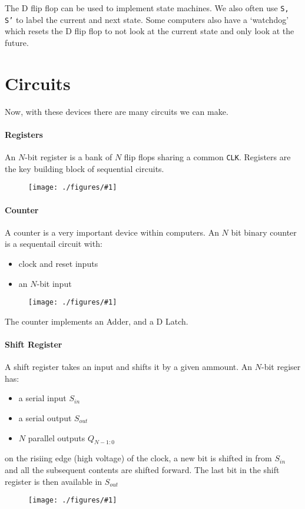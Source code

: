 \documentclass[12pt]{book}
\newcommand{\incimg}[2]{%
       \begin{figure}[h]
               \centering
               \texttt{[image: ./figures/\#1]}
       \end{figure}
}
\begin{document}
The D flip flop can be used to implement state machines. We also often use \texttt{S, S'} to 
label the current and next state. Some computers also have a `watchdog' which resets the 
D flip flop to not look at the current state and only look at the future.

\section*{Circuits}
Now, with these devices there are many circuits we can make.
\pagebreak

\paragraph{Registers}
An $N$-bit register is a bank of $N$ flip flops sharing a common \texttt{CLK}. Registers
are the key building block of sequential circuits.
\incimg{register}{0.7}

\paragraph{Counter}
A counter is a very important device within computers. An $N$ bit binary counter is a sequentail
circuit with:
\begin{itemize}
        \item clock and reset inputs
        \item an $N$-bit input
\end{itemize}
\incimg{clock}{1}

The counter implements an Adder, and a D Latch.
\pagebreak

\paragraph{Shift Register}
A shift register takes an input and shifts it by a given ammount. An $N$-bit regiser
has:
\begin{itemize}
        \item a serial input \texttt{$S_{in}$}
        \item a serial output \texttt{$S_{out}$}
        \item $N$ parallel outputs \texttt{$Q_{N-1:0}$}
\end{itemize}
on the risiing edge (high voltage) of the clock, a new bit is shifted in from $S_{in}$ and all
the subsequent contents are shifted forward. The last bit in the shift register is 
then available in $S_{out}$
\incimg{shiftReg}{0.8}
\end{document}
